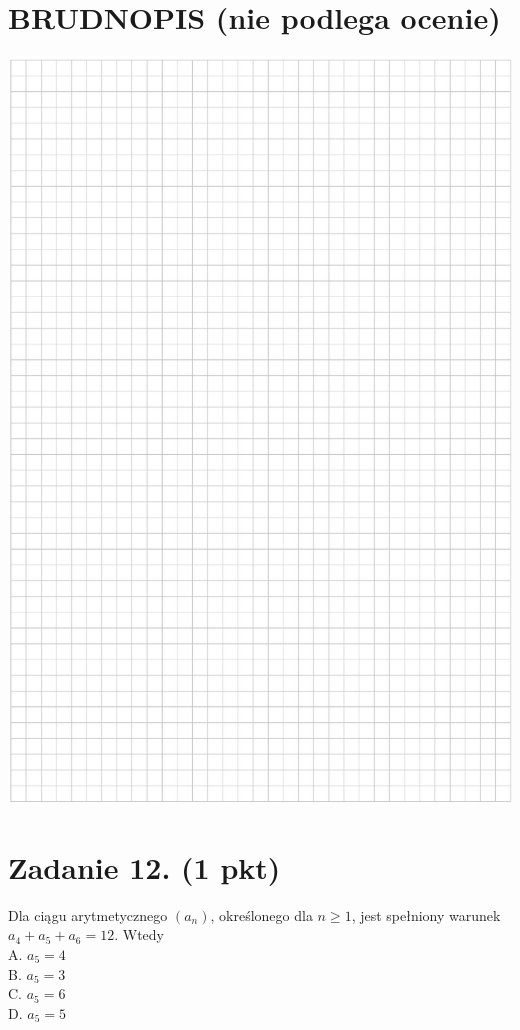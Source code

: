 \documentclass[10pt]{article}
\begin{document}
\section*{BRUDNOPIS (nie podlega ocenie)}
\begin{center}
\includegraphics[max width=\textwidth]{2024_11_21_9383c97fb44abf35abe9g-05}
\end{center}

\section*{Zadanie 12. (1 pkt)}
Dla ciągu arytmetycznego \(\left(a_{n}\right)\), określonego dla \(n \geq 1\), jest spełniony warunek \(a_{4}+a_{5}+a_{6}=12\). Wtedy\\
A. \(a_{5}=4\)\\
B. \(a_{5}=3\)\\
C. \(a_{5}=6\)\\
D. \(a_{5}=5\)
\end{document}
